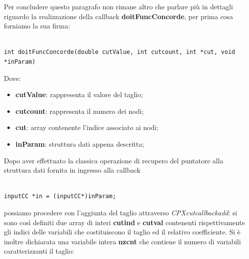 \documentclass[11pt]{article}
\begin{document}
Per concludere questo paragrafo non rimane altro che parlare più in dettagli riguardo la realizzazione della callback \textbf{doitFuncConcorde}, per prima cosa forniamo la sua firma:

\begin{lstlisting}

int doitFuncConcorde(double cutValue, int cutcount, int *cut, void *inParam)

\end{lstlisting}

Dove:

\begin{itemize}
    \item \textbf{cutValue}: rappresenta il valore del taglio;
    \item \textbf{cutcount}: rappresenta il numero dei nodi;
    \item \textbf{cut}: array contenente l'indice associato ai nodi;
    \item \textbf{inParam}: struttura dati appena descritta;
\end{itemize}

Dopo aver effettuato la classica operazione di recupero del puntatore alla struttura dati fornita in ingresso alla callback

\begin{lstlisting}

inputCC *in = (inputCC*)inParam;

\end{lstlisting}

possiamo procedere con l'aggiunta del taglio  attraverso \textit{CPXcutcallbackadd}: si sono così definiti due array di interi \textbf{cutind} e \textbf{cutval} contenenti rispettivamente gli indici delle variabili che costituiscono il taglio ed il relativo coefficiente. Si è inoltre dichiarata una variabile intera \textbf{nzcnt} che contiene il numero di variabili caratterizzanti il taglio:
\end{document}
